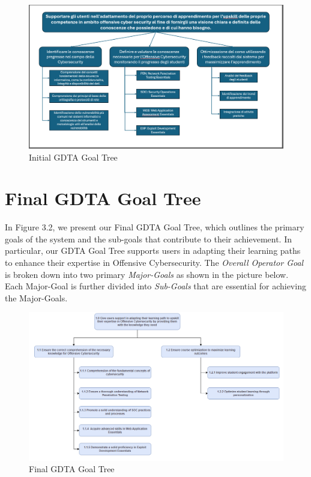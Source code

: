 \begin{figure}[H]
    \centering
    \includegraphics[width=\textwidth]{./assets/GDTA-vecchia.png}
    \caption{Initial GDTA Goal Tree}
    \label{fig:GDTA}
\end{figure}

\newpage
\section{Final GDTA Goal Tree}
In Figure 3.2, we present our Final GDTA Goal Tree, which outlines the primary goals of the system and the sub-goals that contribute to their achievement. In particular, our GDTA Goal Tree supports users in adapting their learning paths to enhance their expertise in Offensive Cybersecurity.
The \textit{Overall Operator Goal} is broken down into two primary \textit{Major-Goals} as shown in the picture below. Each Major-Goal is further divided into \textit{Sub-Goals} that are essential for achieving the Major-Goals. 

\begin{figure}[H]
    \centering
    \includegraphics[width=\textwidth]{./assets/GDTA.png}
    \caption{Final GDTA Goal Tree}
    \label{fig:GDTA}
\end{figure}

